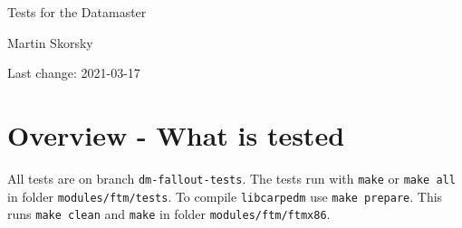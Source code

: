 \documentclass[12pt,a4paper]{report}
\begin{document}
\begin{titlepage}
\vspace{2cm}
\begin{center}
\Huge{Tests for the Datamaster}

\Large{Martin Skorsky}

\Large{Last change: 2021-03-17}
\end{center}
\vfill
\end{titlepage}

\tableofcontents

\chapter{Overview - What is tested}
All tests are on branch \texttt{dm-fallout-tests}. The tests run with \texttt{make} or \texttt{make all} in folder \texttt{modules/ftm/tests}.
To compile \texttt{libcarpedm} use \texttt{make prepare}. This runs \texttt{make clean} and \texttt{make} in folder \texttt{modules/ftm/ftmx86}.
\end{document}
